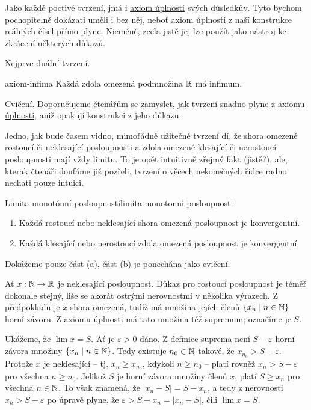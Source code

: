 Jako každé poctivé tvrzení, jmá i \hyperref[prop:axiom-uplnosti]{axiom úplnosti}
svých důsledkův. Tyto bychom pochopitelně dokázati uměli i bez něj, neboť axiom
úplnosti z naší konstrukce reálných čísel přímo plyne. Nicméně, zcela jistě jej
lze použít jako nástroj ke zkrácení některých důkazů.

Nejprve duální tvrzení.

\begin{proposition}{}{axiom-infima}
 Každá zdola omezená podmnožina $\mathbb{R}$ má infimum.
\end{proposition}
\begin{propproof}
 Cvičení. Doporučujeme čtenářům se zamyslet, jak tvrzení snadno plyne z
 \hyperref[prop:axiom-uplnosti]{axiomu úplnosti}, aniž opakují konstrukci z jeho
 důkazu.
\end{propproof}

Jedno, jak bude časem vidno, mimořádně užitečné tvrzení dí, že shora omezené
rostoucí či neklesající posloupnosti a zdola omezené klesající či nerostoucí
posloupnosti mají vždy limitu. To je opět intuitivně zřejmý fakt (jistě?), ale,
kterak čtenáři doufáme již pozřeli, tvrzení o věcech nekonečných řídce radno
nechati pouze intuici.

\begin{lemma}{Limita monotónní posloupnosti}{limita-monotonni-posloupnosti}
 \begin{enumerate}[label=(\alph*)]
  \item Každá rostoucí nebo neklesající shora omezená posloupnost je
   konvergentní.
  \item Každá klesající nebo nerostoucí zdola omezená posloupnost je
   konvergentní.
 \end{enumerate}
\end{lemma}
\begin{lemproof}
 Dokážeme pouze část (a), část (b) je ponechána jako cvičení.

 Ať $x:\mathbb{N} \to \mathbb{R}$ je neklesající posloupnost. Důkaz pro rostoucí posloupnost je
 téměř dokonale stejný, liše se akorát ostrými nerovnostmi v několika výrazech.
 Z předpokladu je $x$ shora omezená, tudíž má množina jejích členů $\{x_n \mid n
 \in \mathbb{N}\}$ horní závoru. Z \hyperref[prop:axiom-uplnosti]{axiomu úplnosti} má
 tato množina též supremum; označíme je $S$.

 Ukážeme, že $\lim x = S$. Ať je $\varepsilon>0$ dáno. Z
 \hyperref[def:supremum-a-infimum]{definice suprema} není $S - \varepsilon$
 horní závora množiny $\{x_n \mid n \in \mathbb{N}\}$. Tedy existuje $n_0 \in \mathbb{N}$
 takové, že $x_{n_0} > S - \varepsilon$. Protože $x$ je neklesající -- tj. $x_n
 \geq x_{n_0}$, kdykoli $n \geq n_0$ -- platí rovněž $x_n > S - \varepsilon$ pro
 všechna $n \geq n_0$. Jelikož $S$ je horní závora množiny členů $x$, platí $S
\geq x_n$ pro všechna $n \in \mathbb{N}$. To však znamená, že $|x_n - S| = S - x_n$, a
tedy z nerovnosti $x_n > S - \varepsilon$ po úpravě plyne, že $\varepsilon > S -
x_n = |x_n - S|$, čili $\lim x = S$.
\end{lemproof}

